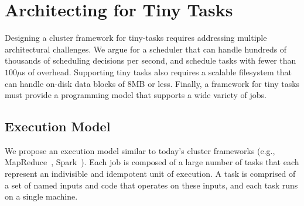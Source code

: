 \section{Architecting for Tiny Tasks}
Designing a cluster framework for tiny-tasks requires addressing multiple
architectural challenges. We argue for a scheduler that can handle hundreds of
thousands of scheduling decisions per second, and schedule tasks with
fewer than $100 \mu$s of overhead.  Supporting tiny tasks also requires a
scalable filesystem that can handle on-disk data blocks of $8$MB or less.
Finally, a framework for tiny tasks must provide a programming model that
supports a wide variety of jobs.

\subsection{Execution Model}
We propose an execution model similar to today's cluster frameworks (e.g.,
MapReduce~\cite{??}, Spark~\cite{??}). Each job is composed of a large number
of tasks that each represent an indivisible and idempotent unit of
execution. A task is comprised of a set of named
inputs and code that operates on these inputs, and each task runs on a single
machine.

